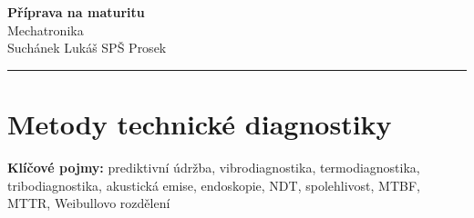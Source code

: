\documentclass[a4paper,10pt]{article}
\begin{document}
\begin{minipage}[t]{0.75\textwidth}
    {\Huge\bfseries\color{accent} Příprava na maturitu}\\[4pt]
    {\large\color{stripeblue} Mechatronika}\\[2pt]
    \textcolor{medgray}{\small Suchánek Lukáš \quad SPŠ Prosek }
\end{minipage}
\hfill
\begin{minipage}[t]{0.22\textwidth}
    \raggedleft
\end{minipage}

\vspace{6pt}
\noindent\color{accent}\rule{\linewidth}{1.5pt}
\vspace{2pt}

\section{Metody technické diagnostiky}

\begin{pojmybox}
\textbf{Klíčové pojmy:}
prediktivní údržba, vibrodiagnostika, termodiagnostika,
tribodiagnostika, akustická emise, endoskopie, NDT,
spolehlivost, MTBF, MTTR, Weibullovo rozdělení
\end{pojmybox}
\end{document}
